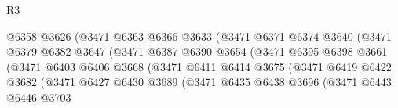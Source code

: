 \begin{lexlean}{R3}
\begin{coremodule}
                                        @6358
                                        @3626
                                        (@3471
                                          @6363
                                          @6366
                                          @3633
                                          (@3471
                                            @6371
                                            @6374
                                            @3640
                                            (@3471
                                              @6379
                                              @6382
                                              @3647
                                              (@3471
                                                @6387
                                                @6390
                                                @3654
                                                (@3471
                                                  @6395
                                                  @6398
                                                  @3661
                                                  (@3471
                                                    @6403
                                                    @6406
                                                    @3668
                                                    (@3471
                                                      @6411
                                                      @6414
                                                      @3675
                                                      (@3471
                                                        @6419
                                                        @6422
                                                        @3682
                                                        (@3471
                                                          @6427
                                                          @6430
                                                          @3689
                                                          (@3471
                                                            @6435
                                                            @6438
                                                            @3696
                                                            (@3471
                                                              @6443
                                                              @6446
                                                              @3703

\end{coremodule}
\end{lexlean}
